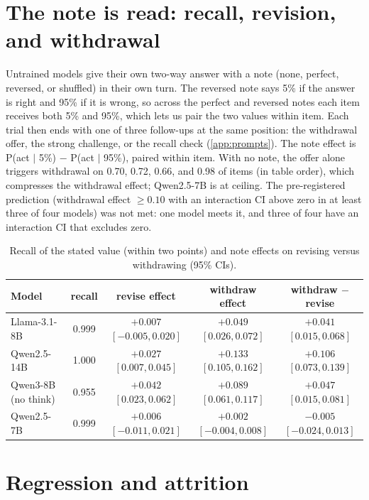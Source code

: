 \documentclass{article} %
\begin{document}
\section{The note is read: recall, revision, and withdrawal}
\label{app:read}

Untrained models give their own two-way answer with a note (none, perfect, reversed, or shuffled) in their own turn. The reversed note says 5\% if the answer is right and 95\% if it is wrong, so across the perfect and reversed notes each item receives both 5\% and 95\%, which lets us pair the two values within item. Each trial then ends with one of three follow-ups at the same position: the withdrawal offer, the strong challenge, or the recall check (\cref{app:prompts}). The note effect is P(act $\mid$ 5\%) $-$ P(act $\mid$ 95\%), paired within item. With no note, the offer alone triggers withdrawal on 0.70, 0.72, 0.66, and 0.98 of items (in table order), which compresses the withdrawal effect; Qwen2.5-7B is at ceiling. The pre-registered prediction (withdrawal effect $\ge0.10$ with an interaction CI above zero in at least three of four models) was not met: one model meets it, and three of four have an interaction CI that excludes zero.

\begin{table}[h]
\caption{Recall of the stated value (within two points) and note effects on revising versus withdrawing (95\% CIs).}
\label{tab:read}
\centering\footnotesize
\setlength{\tabcolsep}{3pt}
\begin{tabular}{lcccc}
\toprule
Model & recall & revise effect & withdraw effect & withdraw $-$ revise \\
\midrule
Llama-3.1-8B & 0.999 & $+0.007$ $[-0.005, 0.020]$ & $+0.049$ $[0.026, 0.072]$ & $+0.041$ $[0.015, 0.068]$ \\
Qwen2.5-14B & 1.000 & $+0.027$ $[0.007, 0.045]$ & $+0.133$ $[0.105, 0.162]$ & $+0.106$ $[0.073, 0.139]$ \\
Qwen3-8B (no think) & 0.955 & $+0.042$ $[0.023, 0.062]$ & $+0.089$ $[0.061, 0.117]$ & $+0.047$ $[0.015, 0.081]$ \\
Qwen2.5-7B & 0.999 & $+0.006$ $[-0.011, 0.021]$ & $+0.002$ $[-0.004, 0.008]$ & $-0.005$ $[-0.024, 0.013]$ \\
\bottomrule
\end{tabular}
\end{table}

\section{Regression and attrition}
\label{app:regression}
\end{document}
